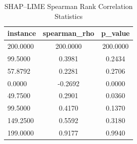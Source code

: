 \begin{table}
\centering
\caption{SHAP–LIME Spearman Rank Correlation Statistics}
\label{tab:agreement}
\begin{tabular}{lcc}
\toprule
instance & spearman_rho & p_value \\
\midrule
200.0000 & 200.0000 & 200.0000 \\
99.5000 & 0.3981 & 0.2434 \\
57.8792 & 0.2281 & 0.2706 \\
0.0000 & -0.2692 & 0.0000 \\
49.7500 & 0.2901 & 0.0360 \\
99.5000 & 0.4170 & 0.1370 \\
149.2500 & 0.5592 & 0.3180 \\
199.0000 & 0.9177 & 0.9940 \\
\bottomrule
\end{tabular}
\end{table}
